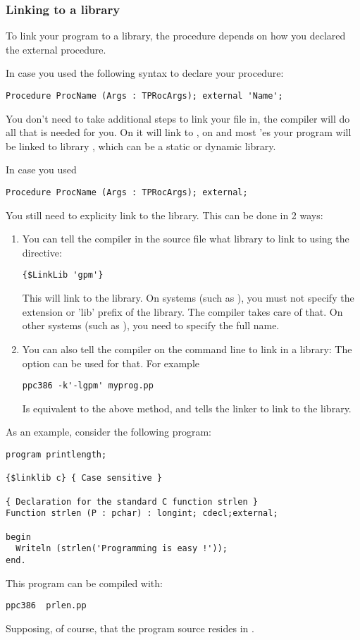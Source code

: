 \subsubsection{Linking to a library}
\label{se:LinkOut}

To link your program to a library, the procedure depends on how you declared
the external procedure.

In case you used the following syntax to declare your procedure:
\begin{verbatim}
Procedure ProcName (Args : TPRocArgs); external 'Name';
\end{verbatim}
You don't need to take additional steps to link your file in, the compiler
will do all that is needed for you. On \windows it will link to
, on \linux and most \unix'es your program will be linked to library
, which can be a static or dynamic library.

In case you used
\begin{verbatim}
Procedure ProcName (Args : TPRocArgs); external;
\end{verbatim}
You still need to explicity link to the library. This can be done in 2 ways:
\begin{enumerate}
\item You can tell the compiler in the source file what library to link to
using the  directive:
\begin{verbatim}
{$LinkLib 'gpm'}
\end{verbatim}
This will link to the  library. On \unix systems (such as \linux),
you must not specify the extension or 'lib' prefix of the library. The compiler takes
care of that. On other systems (such as \windows ), you need to specify the full
name.
\item You can also tell the compiler on the command line to link in a
library: The  option can be used for that. For example
\begin{verbatim}
ppc386 -k'-lgpm' myprog.pp
\end{verbatim}
Is equivalent to the above method, and tells the linker to link to the
 library.
\end{enumerate}

As an example, consider the following program:
\begin{verbatim}
program printlength;

{$linklib c} { Case sensitive }

{ Declaration for the standard C function strlen }
Function strlen (P : pchar) : longint; cdecl;external;

begin
  Writeln (strlen('Programming is easy !'));
end.
\end{verbatim}
This program can be compiled with:
\begin{verbatim}
ppc386  prlen.pp
\end{verbatim}
Supposing, of course, that the program source resides in .

